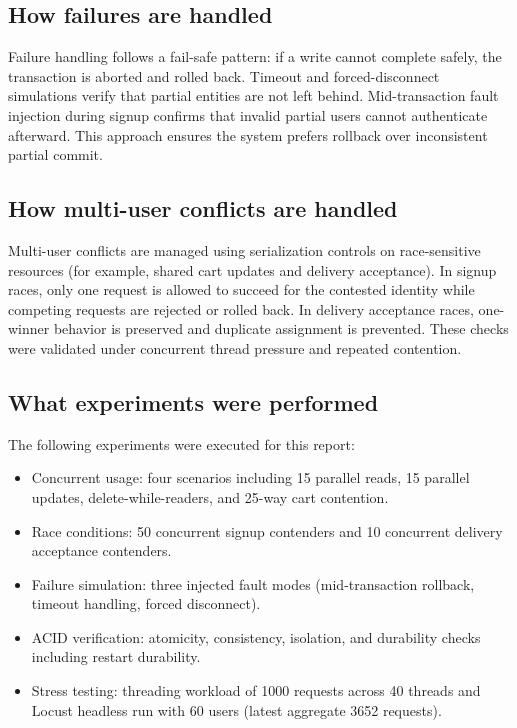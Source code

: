 \documentclass[a4paper, 11pt]{article}
\begin{document}
\subsection{How failures are handled}
Failure handling follows a fail-safe pattern: if a write cannot complete safely, the transaction is aborted and rolled back. Timeout and forced-disconnect simulations verify that partial entities are not left behind. Mid-transaction fault injection during signup confirms that invalid partial users cannot authenticate afterward. This approach ensures the system prefers rollback over inconsistent partial commit.

\subsection{How multi-user conflicts are handled}
Multi-user conflicts are managed using serialization controls on race-sensitive resources (for example, shared cart updates and delivery acceptance). In signup races, only one request is allowed to succeed for the contested identity while competing requests are rejected or rolled back. In delivery acceptance races, one-winner behavior is preserved and duplicate assignment is prevented. These checks were validated under concurrent thread pressure and repeated contention.

\subsection{What experiments were performed}
The following experiments were executed for this report:
\begin{itemize}
    \item Concurrent usage: four scenarios including 15 parallel reads, 15 parallel updates, delete-while-readers, and 25-way cart contention.
    \item Race conditions: 50 concurrent signup contenders and 10 concurrent delivery acceptance contenders.
    \item Failure simulation: three injected fault modes (mid-transaction rollback, timeout handling, forced disconnect).
    \item ACID verification: atomicity, consistency, isolation, and durability checks including restart durability.
    \item Stress testing: threading workload of 1000 requests across 40 threads and Locust headless run with 60 users (latest aggregate 3652 requests).
\end{itemize}
\end{document}
